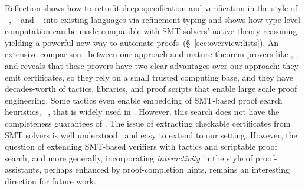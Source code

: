 %
Reflection shows how to retrofit deep
specification and verification in the
style of \agda~\citep{agda},
\coq~\citep{coq-book} and
\isabelle~\cite{NPW2002} into existing
languages via refinement typing and
\pbesym shows how type-level computation
can be made compatible with SMT solvers'
native theory reasoning yielding a
powerful new way to automate
proofs~(\S~\ref{sec:overview:lists}).
%
An extensive comparison~\cite{Vazou17}
between our approach and mature theorem 
provers like \coq, \agda, and \isabelle
reveals that these provers 
have two clear advantages
over our approach:
%
they emit certificates,
so they rely on a small
trusted computing base,
and they have decades-worth
of tactics, libraries,
and proof scripts that
enable large scale proof
engineering.
%
Some tactics even enable
embedding of SMT-based
proof search heuristics,
\eg {}~\cite{sledgehammer},
that is widely used in
\isabelle.
However, this search
does not have the
completeness
guarantees of \pbesym.
%
The issue of extracting checkable
certificates from SMT solvers is well
understood~\cite{Necula97,chen-pldi-2010}
and easy to extend to our setting.
%
However, the question of extending SMT-based
verifiers with tactics and scriptable proof
search, and more generally, incorporating
\emph{interactivity} in the style of
proof-assistants, perhaps enhanced by
proof-completion hints, remains an
interesting direction for future work.





